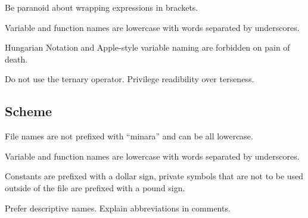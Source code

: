 Be paranoid about wrapping expressions in brackets.

Variable and function names are lowercase with words separated by underscores.

Hungarian Notation and Apple-style variable naming are forbidden on pain of death.

Do not use the ternary operator. Privilege readibility over terseness.

\subsection{Scheme}

File names are not prefixed with ``minara'' and can be all lowercase.

Variable and function names are lowercase with words separated by underscores.

Constants are prefixed with a dollar sign, private symbols that are not to be used outside of the file are prefixed with a pound sign.

Prefer descriptive names. Explain abbreviations in comments.
